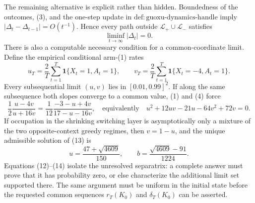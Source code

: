 The remaining alternative is explicit rather than hidden.  Boundedness of
the outcomes, (3), and the one-step update in
\(\mathrm{def{:}guoxu\text{-}dynamics\text{-}handle}\) imply
\(|\Delta_t-\Delta_{t-1}|=O(t^{-1})\).  Hence every path outside
\(\mathcal L_+\cup\mathcal L_-\) satisfies
\[
 \liminf_{t\to\infty}|\Delta_t|=0.
 \tag{12}
\]
There is also a computable necessary condition for a common-coordinate
limit.  Define the empirical conditional arm-(1) rates
\[
 u_T=\frac2T\sum_{t=1}^T\mathbf1\{X_t=1,A_t=1\},
 \qquad
 v_T=\frac2T\sum_{t=1}^T\mathbf1\{X_t=-4,A_t=1\}.
\]
Every subsequential limit \((u,v)\) lies in \([0.01,0.99]^2\).  If along the
same subsequence both slopes converge to a common value, (1) and (4) force
\[
 \frac12\frac{u-4v}{u+16v}
 =\frac1{12}\frac{-3-u+4v}{17-u-16v},
 \quad\text{equivalently}\quad
 u^2+12uv-21u-64v^2+72v=0.
 \tag{13}
\]
If occupation in the shrinking switching layer is asymptotically only a
mixture of the two opposite-context greedy regimes, then \(v=1-u\), and the
unique admissible solution of (13) is
\[
 u=\frac{47+\sqrt{4609}}{150},
 \qquad
 b=\frac{\sqrt{4609}-91}{1224}.
 \tag{14}
\]
Equations (12)--(14) isolate the unresolved separatrix: a complete answer
must prove that it has probability zero, or else characterize the additional
limit set supported there.  The same argument must be uniform in the initial
state before the requested common sequences \(r_T(K_0)\) and
\(\delta_T(K_0)\) can be asserted.